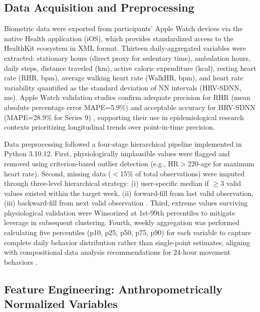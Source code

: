 \subsection{Data Acquisition and Preprocessing}
\label{subsec:acquisition}

Biometric data were exported from participants' Apple Watch devices via the native Health application (iOS), which provides standardized access to the HealthKit ecosystem in XML format. Thirteen daily-aggregated variables were extracted: stationary hours (direct proxy for sedentary time), ambulation hours, daily steps, distance traveled (km), active caloric expenditure (kcal), resting heart rate (RHR, bpm), average walking heart rate (WalkHR, bpm), and heart rate variability quantified as the standard deviation of NN intervals (HRV-SDNN, ms). Apple Watch validation studies confirm adequate precision for RHR (mean absolute percentage error MAPE=5.9\%) and acceptable accuracy for HRV-SDNN (MAPE=28.9\% for Series 9) \cite{OGrady2024AppleWatch,Khushhal2025AppleCardiac}, supporting their use in epidemiological research contexts prioritizing longitudinal trends over point-in-time precision.

Data preprocessing followed a four-stage hierarchical pipeline implemented in Python 3.10.12. First, physiologically implausible values were flagged and removed using criterion-based outlier detection (e.g., HR$>$220-age for maximum heart rate). Second, missing data ($<$15\% of total observations) were imputed through three-level hierarchical strategy: (i) user-specific median if $\geq$3 valid values existed within the target week, (ii) forward-fill from last valid observation, (iii) backward-fill from next valid observation \cite{Little1988,Azur2011}. Third, extreme values surviving physiological validation were Winsorized at 1st-99th percentiles to mitigate leverage in subsequent clustering. Fourth, weekly aggregation was performed calculating five percentiles (p10, p25, p50, p75, p90) for each variable to capture complete daily behavior distribution rather than single-point estimates, aligning with compositional data analysis recommendations for 24-hour movement behaviors \cite{Chastin2015,Dumuid2018}.

\subsection{Feature Engineering: Anthropometrically Normalized Variables}
\label{subsec:features}

